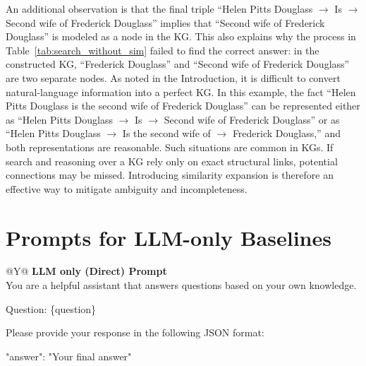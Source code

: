 \documentclass{article}
\theoremstyle{plain}
\theoremstyle{definition}
\theoremstyle{remark}
\begin{document}
An additional observation is that the final triple “Helen Pitts Douglass $\rightarrow$ Is $\rightarrow$ Second wife of Frederick Douglass” implies that “Second wife of Frederick Douglass” is modeled as a node in the KG. This also explains why the process in Table~\ref{tab:search_without_sim} failed to find the correct answer: in the constructed KG, “Frederick Douglass” and “Second wife of Frederick Douglass” are two separate nodes. As noted in the Introduction, it is difficult to convert natural-language information into a perfect KG. In this example, the fact “Helen Pitts Douglass is the second wife of Frederick Douglass” can be represented either as “Helen Pitts Douglass $\rightarrow$ Is $\rightarrow$ Second wife of Frederick Douglass” or as “Helen Pitts Douglass $\rightarrow$ Is the second wife of $\rightarrow$ Frederick Douglass,” and both representations are reasonable. Such situations are common in KGs. If search and reasoning over a KG rely only on exact structural links, potential connections may be missed. Introducing similarity expansion is therefore an effective way to mitigate ambiguity and incompleteness.


\section{Prompts for LLM-only Baselines} \label{FF}

\begin{table}[htb]
  \centering
  \caption{LLM only (Direct) Prompt}
  \label{tab:llm_only}
  \begin{tabularx}{\textwidth}{@{}Y@{}}
    \toprule
    \textbf{LLM only (Direct) Prompt} \\     %
    \midrule
    You are a helpful assistant that answers questions based on your own knowledge.\\

    \par\medskip
    Question: \{question\} \\
    
    \par\medskip
    Please provide your response in the following JSON format:\\

    \par\medskip
    "answer": "Your final answer"\\
    \bottomrule
  \end{tabularx}
\end{table}
\end{document}
